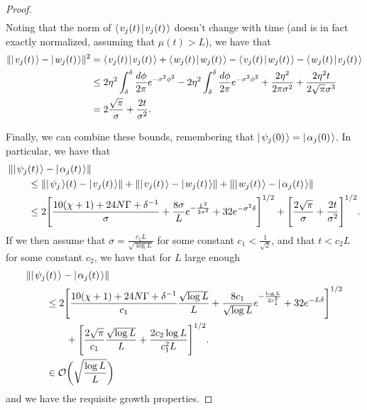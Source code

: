\documentclass[../thesis-main/thesis-main]{subfiles}
\begin{document}
\begin{proof}
\begin{align}
\end{align}
Noting that the norm of $\langle\mspace{2mu} v_j(t) \mspace{2mu} | \mspace{2mu} v_j(t)\mspace{2mu} \rangle$ doesn't change with time (and is in fact exactly normalized, assuming that $\mu(t) > L$), we have that
\begin{align}
  \|{|\mspace{2mu} v_j(t) \mspace{2mu} \rangle - |\mspace{2mu} w_j(t) \mspace{2mu} \rangle}\|^2 &= \langle\mspace{2mu} v_j(t) \mspace{2mu} | \mspace{2mu} v_j(t)\mspace{2mu} \rangle + \langle\mspace{2mu} w_j(t) \mspace{2mu} | \mspace{2mu} w_j(t)\mspace{2mu} \rangle - \langle\mspace{2mu} v_j(t) \mspace{2mu} | \mspace{2mu} w_j(t)\mspace{2mu} \rangle - \langle\mspace{2mu} w_j(t) \mspace{2mu} | \mspace{2mu} v_j(t)\mspace{2mu} \rangle\\
  &\leq 2 \eta^2 \int_{\delta}^\delta \frac{d\phi}{2\pi} e^{-\sigma^2 \phi^2} - 2\eta^2 \int_{\delta}^\delta \frac{d\phi}{2\pi }e^{ - \sigma^2 \phi^2} + \frac{2\eta^2}{2\pi \sigma^2} + \frac{2 \eta^2 t}{2\sqrt{\pi} \sigma^3}\\
  &= 2 \frac{\sqrt{\pi}}{ \sigma} + \frac{2 t }{\sigma^2}.
\end{align}

Finally, we can combine these bounds, remembering that $|\mspace{2mu} \psi_j(0) \mspace{2mu} \rangle = |\mspace{2mu} \alpha_j(0) \mspace{2mu} \rangle$.  In particular, we have that
\begin{align}
  &\|{ |\mspace{2mu} \psi_j(t) \mspace{2mu} \rangle - |\mspace{2mu} \alpha_j(t) \mspace{2mu} \rangle}\|\nonumber\\
   &\qquad \leq \|{ |\mspace{2mu} \psi_j \mspace{2mu} \rangle{(t)} - |\mspace{2mu} v_j(t) \mspace{2mu} \rangle}\| + \|{|\mspace{2mu}  v_j(t) \mspace{2mu} \rangle - |\mspace{2mu} w_j(t) \mspace{2mu} \rangle}\| + \|{|\mspace{2mu} w_j(t) \mspace{2mu} \rangle - |\mspace{2mu} \alpha_j(t) \mspace{2mu} \rangle}\|\\
  & \qquad \leq 2\Bigg[ \frac{10(\chi+1) + 24 N\Gamma + \delta^{-1}}{\sigma} + \frac{8\sigma}{L}e^{-\frac{L^2}{2\sigma^2}}+ 32 e^{-\sigma^2\delta} \Bigg]^{1/2} + \Bigg[ \frac{2 \sqrt{\pi}}{\sigma} + \frac{2t}{\sigma^2}\Bigg]^{1/2} .
\end{align}
If we then assume that $\sigma = \frac{ c_1 L}{\sqrt{\log L}}$ for some constant $c_1< \frac{1}{\sqrt{2}}$, and that $t < c_2 L$ for some constant $c_2$, we have that for $L$ large enough
\begin{align}
  &\|{ |\mspace{2mu} \psi_j(t) \mspace{2mu} \rangle - |\mspace{2mu} \alpha_j(t) \mspace{2mu} \rangle}\|\nonumber\\
  & \qquad \leq 2\Bigg[ \frac{10(\chi+1) + 24 N\Gamma + \delta^{-1}}{c_1} \frac{\sqrt{\log L}}{L} +  \frac{8c_1}{\sqrt{\log L}}e^{-\frac{\log L}{2c_1^2}}+ 32 e^{-L\delta} \Bigg]^{1/2} \nonumber\\
  &\qquad \qquad + \Bigg[ \frac{2 \sqrt{\pi}}{c_1}\frac{\sqrt{\log L}}{L} + \frac{2c_2 \log L}{c_1^2 L}\Bigg]^{1/2} .\\
  &\qquad \in \mathcal{O}\bigg( \sqrt{ \frac{\log L}{L}} \bigg)
\end{align}
and we have the requisite growth properties.
\end{proof}

\end{document}
